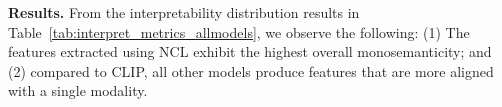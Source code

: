 \begin{table}[h]
    \centering
    \small
    \caption{Average interpretability scores for features extracted from the four models. A larger $|\Delta|$ indicates stronger alignment %
    with a single modality. 
    }
    \label{tab:interpret_metrics_allmodels}
\end{table}

\textbf{Results.}
From the interpretability distribution results %
in Table~\ref{tab:interpret_metrics_allmodels}, we observe the following:
(1) The features extracted using NCL exhibit the highest overall monosemanticity; and (2) compared to CLIP, all other models produce features that are more aligned with a single modality.

